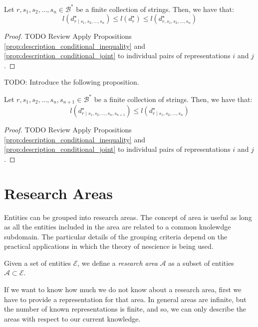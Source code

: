 \begin{proposition}
Let $r, s_1, s_2, \ldots, s_n \in \mathcal{B}^\ast$ be a finite collection of strings. Then, we have that:
\[
l \left( d^\star_{r \mid s_1, s_2, \ldots, s_n} \right) \leq l \left( d^\star_r \right) \leq l \left( d^\star_{r,s_1, s_2, \ldots, s_n} \right)
\]
\end{proposition}
\begin{proof}
{\color{red} TODO Review} Apply Propositions \ref{prop:description_conditional_inequality} and \ref{prop:description_conditional_joint} to individual pairs of representations $i$ and $j$.
\end{proof}

{\color{red} TODO: Introduce the following proposition.}

\begin{proposition}
Let $r, s_1, s_2, \ldots, s_n, s_{n+1} \in \mathcal{B}^\ast$ be a finite collection of strings. Then, we have that:
\[
l \left( d^\star_{r \mid s_1, s_2, \ldots, s_n, s_{n+1}} \right) \leq l \left( d^\star_{r \mid s_1, s_2, \ldots, s_n} \right)
\]
\end{proposition}
\begin{proof}
{\color{red} TODO Review} Apply Propositions \ref{prop:description_conditional_inequality} and \ref{prop:description_conditional_joint} to individual pairs of representations $i$ and $j$.
\end{proof}

%
%

\section{Research Areas}
\label{sec:areas}

Entities can be grouped into research areas. The concept of area is useful as long as all the entities included in the area are related to a common knolewdge subdomain. The particular details of the grouping criteria depend on the practical applications in which the theory of nescience is being used.

\begin{definition}
Given a set of entities $\mathcal{E}$, we define a \emph{research area} $\mathcal{A}$ as a subset of entities $\mathcal{A} \subset \mathcal{E}$.
\end{definition}

If we want to know how much we do not know about a research area, first we have to provide a representation for that area. In general areas are infinite, but the number of known representations is finite, and so, we can only describe the areas with respect to our current knowledge.

